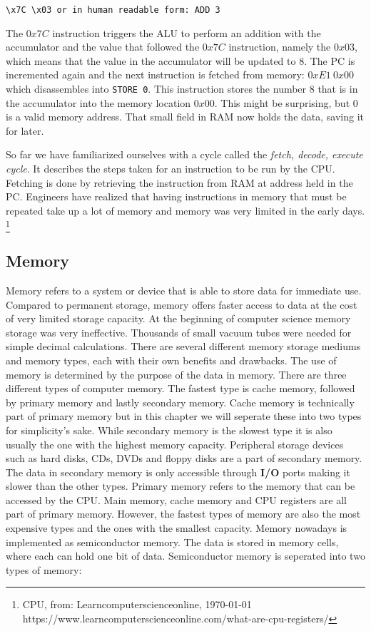 \begin{lstlisting}
\x7C \x03 or in human readable form: ADD 3
\end{lstlisting}

The $0x7C$ instruction triggers the ALU to perform an addition with the accumulator and
the value that followed the $0x7C$ instruction, namely the $0x03$, which means that the value
in the accumulator will be updated to 8. The PC is incremented again and the next instruction is
fetched from memory: $0xE1\ 0x00$ which disassembles into \texttt{STORE 0}. This instruction stores the number 8 
that is in the accumulator into the memory location $0x00$. This might be surprising, but 0 is a
valid memory address. That small field in RAM now holds the data, saving it for later.

So far we have familiarized ourselves with a cycle called the \textit{fetch, decode, execute cycle}. It 
describes the steps taken for an instruction to be run by the CPU. Fetching is done by retrieving
the instruction from RAM at address held in the PC. Engineers have realized that having instructions in memory that must be repeated take up a lot of memory
and memory was very limited in the early days. \footnote{CPU, from: Learncomputerscienceonline, \today \\ https://www.learncomputerscienceonline.com/what-are-cpu-registers/}

\subsection{Memory}

Memory refers to a system or device that is able to store data for immediate use. Compared to permanent 
storage, memory offers faster access to data at the cost of very limited storage capacity. At the 
beginning of computer science memory storage was very ineffective. Thousands of small vacuum tubes 
were needed for simple decimal calculations. There are several different memory storage mediums and memory 
types, each with their own benefits and drawbacks. The use of memory is determined by the purpose of
the data in memory. There are three different types of computer memory. The fastest type is cache
memory, followed by primary memory and lastly secondary memory. Cache memory is technically part of primary memory but 
in this chapter we will seperate these into two types for simplicity's sake. While secondary memory is the slowest type it is
also usually the one with the highest memory capacity. Peripheral storage devices such as hard disks, CDs, DVDs and floppy disks
are a part of secondary memory. The data in secondary memory is only accessible through \textbf{I/O} ports making 
it slower than the other types. Primary memory refers to the memory that can be accessed by the CPU. Main memory, 
cache memory and CPU registers are all part of primary memory. However, the fastest types of memory 
are also the most expensive types and the ones with the smallest capacity. Memory nowadays is 
implemented as semiconductor memory. The data is stored in memory cells, where each can hold one bit 
of data. Semiconductor memory is seperated into two types of memory:

